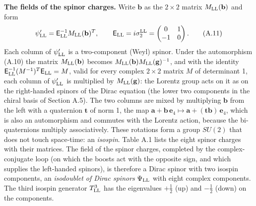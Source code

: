 \documentclass[
  10pt,
]{article}
\begin{document}
\textbf{The fields of the spinor charges.} Write \(\mathbf b\) as the
\(2\times2\) matrix \(M_{\rm LL}(\mathbf b)\) and form
\[\psi'_{\rm LL}=\mathsf E^{-1}_{\rm LL}M_{\rm LL}(\mathbf b)^T,\qquad\mathsf E_{\rm LL}=i\sigma^{\rm LL}_2=\begin{pmatrix}0&1\\-1&0\end{pmatrix}.\tag{A.11}\]
Each column of \(\psi'_{\rm LL}\) is a two-component (Weyl) spinor.
Under the automorphism (A.10) the matrix \(M_{\rm LL}(\mathbf b)\)
becomes \(M_{\rm LL}(\mathbf b)M_{\rm LL}(\mathbf g)^{-1}\), and with
the identity \(\mathsf E_{\rm LL}^{-1}(M^{-1})^T\mathsf E_{\rm LL}=M\),
valid for every complex \(2\times2\) matrix \(M\) of determinant 1, each
column of \(\psi'_{\rm LL}\) is multiplied by \(M_{\rm LL}(\mathbf g)\):
the Lorentz group acts on it as on the right-handed spinors of the Dirac
equation (the lower two components in the chiral basis of Section A.5).
The two columns are mixed by multiplying \(\mathbf b\) from the left
with a quaternion \(\mathbf t\) of norm 1, the map
\(\mathbf a+\mathbf b\,\mathbf e_4\mapsto\mathbf a+(\mathbf t\mathbf b)\,\mathbf e_4\),
which is also an automorphism and commutes with the Lorentz action,
because the bi-quaternions multiply associatively. These rotations form
a group \(SU(2)\) that does not touch space-time: an \emph{isospin}.
Table A.1 lists the eight spinor charges with their matrices. The field
of the spinor charges, completed by the complex-conjugate loop (on which
the boosts act with the opposite sign, and which supplies the
left-handed spinors), is therefore a Dirac spinor with two isospin
components, an \emph{isodoublet of Dirac spinors} \(\Psi_{\rm LL}\) with
eight complex components. The third isospin generator \(T^3_{\rm LL}\)
has the eigenvalues \(+\tfrac12\) (up) and \(-\tfrac12\) (down) on the
components.
\end{document}

